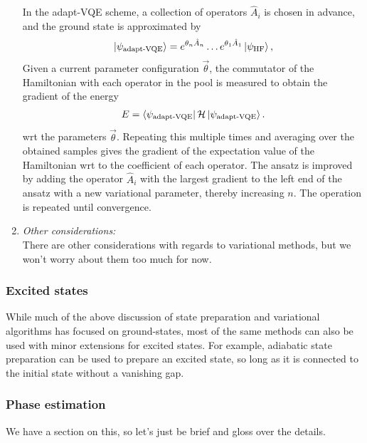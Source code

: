 \documentclass{book}
\theoremstyle{definition}
\newcommand{\had}{\mathcal{H}}
\begin{document}
\begin{enumerate}
	In the adapt-VQE scheme, a collection of operators $\hat{A}_i$ is chosen in advance, and the ground state is approximated by 
	\begin{align}
	\ket{\psi_{\text{adapt-VQE}}} = e^{\theta_n \hat{A}_n}\dots e^{\theta_1 \hat{A}_1}\ket{\psi_{\text{HF}}},
	\end{align}
	Given a current parameter configuration $\vec{\theta}$, the commutator  of the Hamiltonian with each operator in the pool is measured to obtain the gradient of the energy
	\begin{align}
	E = \bra{\psi_{\text{adapt-VQE}}} \had \ket{\psi_{\text{adapt-VQE}}}.
	\end{align}
	wrt the parameters $\vec{\theta}$. Repeating this multiple times and averaging over the obtained samples gives the gradient of the expectation value of the Hamiltonian wrt to the coefficient of each operator. The ansatz is improved by adding the operator $\hat{A}_i$ with the largest gradient to the left end of the ansatz with a new variational parameter, thereby increasing $n$. The operation is repeated until convergence.  
	
	
	
	
	\item \textit{Other considerations:}\\
	
	 There are other considerations with regards to variational methods, but we won't worry about them too much for now.
\end{enumerate}






\subsubsection{Excited states}

While much of the above discussion of state preparation
and variational algorithms has focused on ground-states, most
of the same methods can also be used with minor extensions
for excited states. For example, adiabatic state preparation can
be used to prepare an excited state, so long as it is connected
to the initial state without a vanishing gap.


\subsubsection{Phase estimation}

We have a section on this, so let's just be brief and gloss over the details. \\
\end{document}
